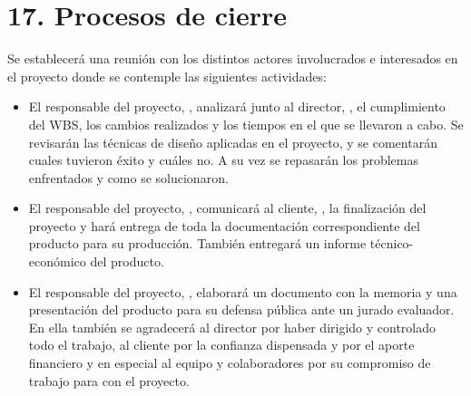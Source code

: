 \documentclass[11pt]{charter}
\begin{document}
\section{17. Procesos de cierre}    
\label{sec:cierre}


Se establecerá una reunión con los distintos actores involucrados e interesados en el proyecto donde se contemple las siguientes actividades:

\begin{itemize}
\item El responsable del proyecto, \authorname, analizará junto al director, \supname, el cumplimiento del WBS, los cambios realizados y los tiempos en el que se llevaron a cabo. Se revisarán las técnicas de diseño aplicadas en el proyecto, y se comentarán cuales tuvieron éxito y cuáles no. A su vez se repasarán los problemas enfrentados y como se solucionaron.

\item El responsable del proyecto, \authorname, comunicará al cliente, \clientename, la finalización del proyecto y hará entrega de toda la documentación correspondiente del producto para su producción. También entregará un informe técnico-económico del producto.

\item El responsable del proyecto, \authorname, elaborará un documento con la memoria y una presentación del producto para su defensa pública ante un jurado evaluador. En ella también se agradecerá al director por haber dirigido y controlado todo el trabajo, al cliente por la confianza dispensada y por el aporte financiero y en especial al equipo y colaboradores por su compromiso de trabajo para con el proyecto. 

\end{itemize}
\end{document}
